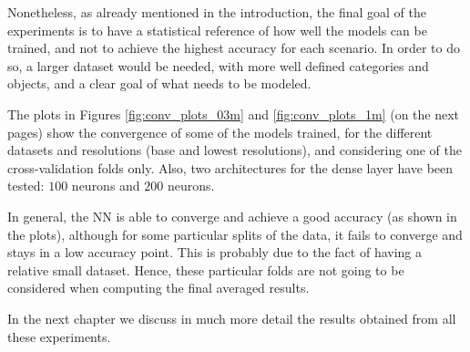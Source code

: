 Nonetheless, as already mentioned in the introduction, the final goal of the experiments is to have a statistical reference of how well the models can be trained, and not to achieve the highest accuracy for each scenario. In order to do so, a larger dataset would be needed, with more well defined categories and objects, and a clear goal of what needs to be modeled.

The plots in Figures \ref{fig:conv_plots_03m} and \ref{fig:conv_plots_1m} (on the next pages) show the convergence of some of the models trained, for the different datasets and resolutions (base and lowest resolutions), and considering one of the cross-validation folds only. Also, two architectures for the dense layer have been tested: $100$ neurons and $200$ neurons. 

In general, the NN is able to converge and achieve a good accuracy (as shown in the plots), although for some particular splits of the data, it fails to converge and stays in a low accuracy point. This is probably due to the fact of having a relative small dataset. Hence, these particular folds are not going to be considered when computing the final averaged results.

In the next chapter we discuss in much more detail the results obtained from all these experiments.

